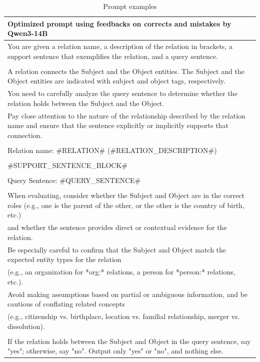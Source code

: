 \documentclass[12pt]{article}
\begin{document}
\begin{table}[h]
\begin{tabular}{l}
\midrule
Optimized prompt using feedbacks on corrects and mistakes by Qwen3-14B\\
\midrule
You are given a relation name, a description of the relation in brackets, a support sentence that exemplifies the relation, and a query sentence.\\
\\
A relation connects the Subject and the Object entities. The Subject and the Object entities are indicated with subject and object tags, respectively. \\
You need to carefully analyze the query sentence to determine whether the relation holds between the Subject and the Object. \\
Pay close attention to the nature of the relationship described by the relation name and ensure that the sentence explicitly or implicitly supports that connection.\\
\\
Relation name: \#RELATION\# (\#RELATION\_DESCRIPTION\#)\\
\\
\#SUPPORT\_SENTENCE\_BLOCK\#\\
\\
Query Sentence: \#QUERY\_SENTENCE\#\\
\\
When evaluating, consider whether the Subject and Object are in the correct roles (e.g., one is the parent of the other, or the other is the country of birth, etc.) \\
and whether the sentence provides direct or contextual evidence for the relation. \\
Be especially careful to confirm that the Subject and Object match the expected entity types for the relation \\
(e.g., an organization for *org:* relations, a person for *person:* relations, etc.). \\
Avoid making assumptions based on partial or ambiguous information, and be cautious of conflating related concepts \\
(e.g., citizenship vs. birthplace, location vs. familial relationship, merger vs. dissolution). \\
\\
If the relation holds between the Subject and Object in the query sentence, say "yes"; otherwise, say "no". Output only "yes" or "no", and nothing else. \\

\bottomrule
\end{tabular}
\caption{Prompt examples}
\label{tab:prompts}
\end{table}
\end{document}
